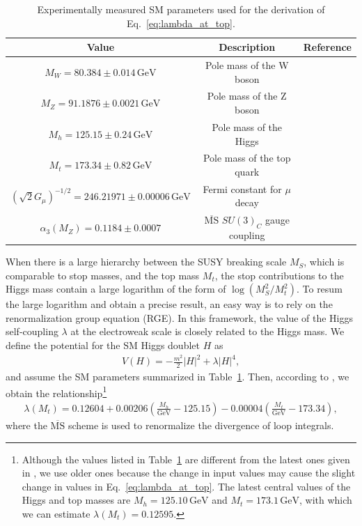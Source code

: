 \documentclass[12pt,twoside,book]{article}
\begin{document}
\begin{table}[t]
  \centering
  \begin{tabular}{ccc}
    Value & Description & Reference\\ \hline
    $M_W = 80.384 \pm 0.014\, \mathrm{GeV}$ & Pole mass of the W boson
      & \cite{Group:2012gb,Alcaraz:1016509} \\
    $M_Z = 91.1876 \pm 0.0021\, \mathrm{GeV}$ & Pole mass of the Z boson
      & \cite{Beringer:1900zz} \\
    $M_h = 125.15 \pm 0.24\, \mathrm{GeV}$ & Pole mass of the Higgs
      & \cite{Aad:2013wqa,Chatrchyan:2013mxa} \\
    $M_t = 173.34 \pm 0.82\, \mathrm{GeV}$ & Pole mass of the top quark
      & \cite{ATLAS:2014wva} \\
    $\left( \sqrt{2} G_\mu \right)^{-1/2} = 246.21971 \pm 0.00006\, \mathrm{GeV}$
      & Fermi constant for $\mu$ decay & \cite{Tishchenko:2012ie} \\
    $\alpha_3 (M_Z) = 0.1184 \pm 0.0007$
      & $\overline{\mathrm{MS}}$ $SU(3)_C$ gauge coupling & \cite{Bethke:2012jm}
  \end{tabular}
  \caption{Experimentally measured SM parameters used for the derivation of Eq.~\eqref{eq:lambda_at_top}.}
  \label{tab:SM_param}
\end{table}

When there is a large hierarchy between the SUSY breaking scale $M_S$, which is comparable to stop masses, and the top mass $M_t$, the stop contributions to the Higgs mass contain a large logarithm of the form of $\log \left( M_S^2 / M_t^2 \right)$.
To resum the large logarithm and obtain a precise result, an easy way is to rely on the renormalization group equation (RGE).
In this framework, the value of the Higgs self-coupling $\lambda$ at the electroweak scale is closely related to the Higgs mass.
We define the potential for the SM Higgs doublet $H$ as
\begin{align}
  V(H) = -\frac{m^2}{2} |H|^2 + \lambda |H|^4,
\end{align}
and assume the SM parameters summarized in Table~\ref{tab:SM_param}.
Then, according to \cite{Buttazzo:2013uya}, we obtain the relationship\footnote
{
  Although the values listed in Table~\ref{tab:SM_param} are different from the latest ones given in \cite{Tanabashi:2018oca}, we use older ones because the change in input values may cause the slight change in values in Eq.~\eqref{eq:lambda_at_top}.
  The latest central values of the Higgs and top masses are $M_h = 125.10\,\mathrm{GeV}$ and $M_t = 173.1\,\mathrm{GeV}$, with which we can estimate $\lambda (M_t) = 0.12595$.
}
\begin{align}
  \lambda (M_t) = 0.12604
  + 0.00206 \left( \frac{M_h}{\mathrm{GeV}} - 125.15 \right)
  - 0.00004 \left( \frac{M_t}{\mathrm{GeV}} - 173.34 \right),
  \label{eq:lambda_at_top}
\end{align}
where the $\overline{\mathrm{MS}}$ scheme is used to renormalize the divergence of loop integrals.
\end{document}
